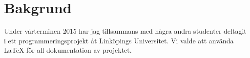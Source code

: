 \section{Bakgrund}
Under vårterminen 2015 har jag tillsammans med några andra studenter deltagit i ett programmeringsprojekt åt Linköpings Universitet. Vi valde att använda {\LaTeX} för all dokumentation av projektet.  
